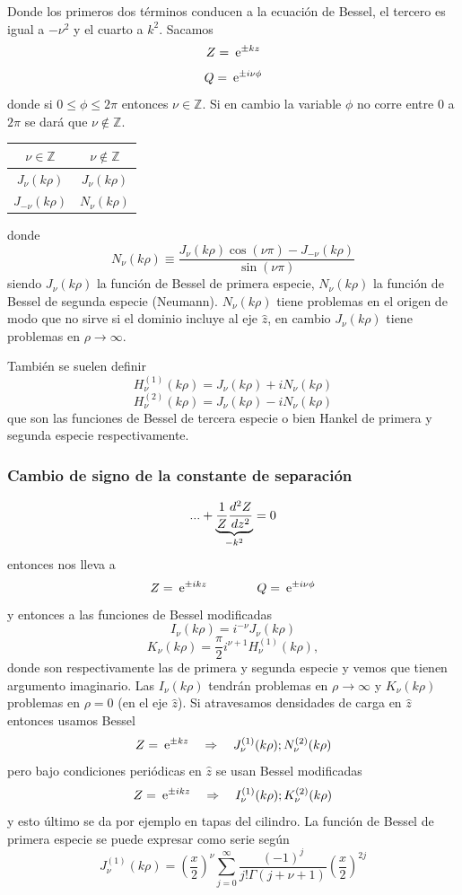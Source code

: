 \documentclass[10pt,oneside]{CBFT_book}
\begin{document}
Donde los primeros dos términos conducen a la ecuación de Bessel, el tercero es igual a $-\nu^2$ y el
cuarto a $k^2$. Sacamos
\[
	Z = \euler^{\pm kz}
\]
\[
	Q = \euler^{\pm i \nu \phi}
\]
donde si $0\leq \phi \leq 2\pi$ entonces $\nu \in \mathbb{Z}$. Si en cambio la variable $\phi$ no corre 
entre $0$ a $2\pi$ se dará que $\nu \notin \mathbb{Z}$.

\begin{center}
	\begin{tabular}{|c|c|}
	\hline
	$ \nu \in \mathbb{Z} $ & $ \nu \notin \mathbb{Z}  $ \\
	\hline
	$J_\nu(k\rho)$ & $J_\nu(k\rho)$ \\
	$J_{-\nu}(k\rho)$ & $N_\nu(k\rho)$ \\
	\hline
	\end{tabular} 
\end{center}
donde 
\[
	N_\nu(k\rho) \equiv \frac{ J_\nu(k\rho) \cos(\nu\pi) - J_{-\nu}(k\rho)}{\sin(\nu\pi)}
\]
siendo $J_\nu(k\rho)$ la función de Bessel de primera especie, $N_\nu(k\rho)$ la función de Bessel de segunda 
especie (Neumann).
$N_\nu(k\rho)$ tiene problemas en el origen de modo que no sirve si el dominio incluye al eje $\hat{z}$, en 
cambio $J_\nu(k\rho)$ tiene problemas en $\rho\to \infty$.

También se suelen definir
\[
	H^{(1)}_\nu(k\rho) = J_\nu(k\rho) + i N_\nu(k\rho)
\]
\[
	H^{(2)}_\nu(k\rho) = J_\nu(k\rho) - i N_\nu(k\rho)
\]
que son las funciones de Bessel de tercera especie o bien Hankel de primera y segunda especie respectivamente.

\subsubsection{Cambio de signo de la constante de separación}

\[
	... + \underbrace{\frac{1}{Z} \dtot[2]{Z}{z}}_{-k^2} =  0
\]
entonces nos lleva a
\[
	Z = \euler^{\pm i k z} \qquad \qquad Q = \euler^{\pm i \nu \phi}
\]
y entonces a las funciones de Bessel modificadas
\[
	I_\nu(k\rho) = i^{-\nu} J_\nu(k\rho)
\]
\[
	K_\nu(k\rho) = \frac{\pi}{2}i^{\nu+1} H_\nu^{(1)}(k\rho),
\]
donde son respectivamente las de primera y segunda especie y vemos que tienen argumento imaginario.
Las $I_\nu(k\rho)$ tendrán problemas en $\rho\to\infty$ y $K_\nu(k\rho)$ problemas en $\rho=0$ (en el eje 
$\hat{z}$).
Si atravesamos densidades de carga en $\hat{z}$ entonces usamos Bessel
\[
	Z = \euler^{\pm k z} \quad \Rightarrow \quad J_\nu^{(1)}(k\rho) ; N_\nu^{(2)}(k\rho)
\]
pero bajo condiciones periódicas en $\hat{z}$ se usan Bessel modificadas
\[
	Z = \euler^{ \pm i k z} \quad \Rightarrow \quad I_\nu^{(1)}(k\rho) ; K_\nu^{(2)}(k\rho)
\]
y esto último se da por ejemplo en tapas del cilindro.
La función de Bessel de primera especie se puede expresar como serie según
\[
	J_\nu^{(1)}(k\rho) = \left(\frac{x}{2}\right)^\nu \sum_{j=0}^\infty \frac{(-1)^j}{j!\Gamma(j+\nu +1)} 
		\left(\frac{x}{2}\right)^{2j}
\]
\end{document}
